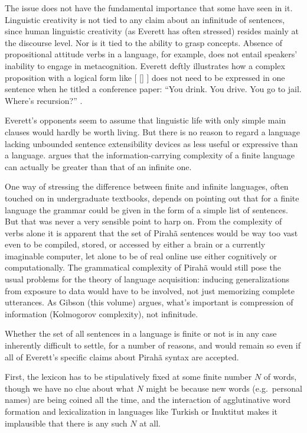 \documentclass[output=paper,colorlinks,citecolor=brown
]{langscibook}
\begin{document}
The issue does not have the fundamental importance that some have seen
in it. Linguistic creativity is not tied to any claim about an infinitude
of sentences, since human linguistic creativity (as Everett has often
stressed) resides mainly at the discourse level.
Nor is it tied to the ability to grasp concepts.
Absence of propositional attitude verbs in a language, for example,
does not entail speakers' inability to engage in metacognition.
Everett deftly illustrates how a complex proposition with a logical
form like [ [] ]  does not need
to be expressed in one sentence when he titled a conference paper:
``You drink. You drive. You go to jail. Where's recursion?''
\citep{Everett10}.

Everett's opponents seem to assume that linguistic life with only
simple main clauses would hardly be worth living.
But there is no reason to regard a language lacking unbounded sentence
extensibility devices as less useful or expressive than a language.
\citet{Kornai14} argues that the information-carrying complexity of
a finite language can actually be greater than that of an infinite one.

One way of stressing the difference between finite and infinite languages,
often touched on in undergraduate textbooks, depends on pointing out that
for a finite language the grammar could be given in the form of a simple
list of sentences. But that was never a very sensible point to harp on.
From the complexity of verbs alone \citep[288--301]{Everett86HAL}
it is apparent that the set of Pirah{\~a} sentences would be way too vast
even to be compiled, stored, or accessed by either a brain or a currently
imaginable computer, let alone to be of real online use either cognitively
or computationally. The grammatical complexity of Pirah{\~a} would still
pose the usual problems for the theory of language acquisition: inducing
generalizations from exposure to data would have to be involved, not just
memorizing complete utterances. As Gibson (this volume) argues, what's
important is compression of information (Kolmogorov complexity), not
infinitude.

Whether the set of all sentences in a language is finite or not is
in any case inherently difficult to settle, for a number of reasons,
and would remain so even if all of Everett's specific claims about
Pirah{\~a} syntax are accepted.

First, the lexicon has to be stipulatively fixed at some finite number
$N$ of words, though we have no clue about what $N$ might be because
new words (e.g.\ personal names) are being coined all the time, and
the interaction of agglutinative word formation and lexicalization
in languages like Turkish or Inuktitut makes it implausible that there
is any such $N$ at all.
\end{document}
